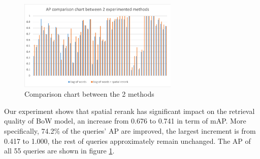\begin{figure}
    \centering
    \includegraphics[width=3.0in]{mAP.pdf}
    \caption{Comparison chart between the 2 methods}
    \label{fig:ap_chart}
\end{figure}

Our experiment shows that spatial rerank has significant impact on the retrieval quality of BoW model, an increase from 0.676 to 0.741 in term of mAP. More specifically, 74.2\% of the queries' AP are improved, the largest increment is from 0.417 to 1.000, the rest of queries approximately remain unchanged. The AP of all 55 queries are shown in figure \ref{fig:ap_chart}.
